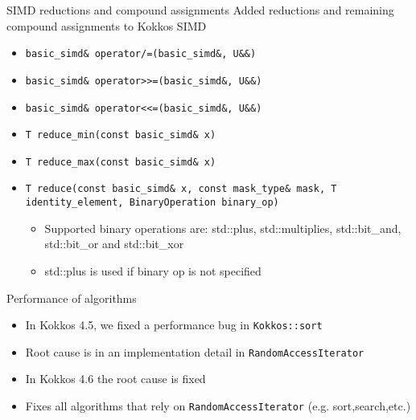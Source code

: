 \begin{frame}[fragile]{SIMD reductions and compound assignments}
  Added reductions and remaining compound assignments to Kokkos SIMD

  \begin{itemize}
    \item \texttt{basic\_simd\& operator/=(basic\_simd\&, U\&\&)}
    \item \texttt{basic\_simd\& operator>>=(basic\_simd\&, U\&\&)}
    \item \texttt{basic\_simd\& operator<<=(basic\_simd\&, U\&\&)}
  \end{itemize}

  \vspace{5pt}
  
  \begin{itemize}
    \item \texttt{T reduce\_min(const basic\_simd\& x)}
    \item \texttt{T reduce\_max(const basic\_simd\& x)}
    \item \texttt{T reduce(const basic\_simd\& x, const mask\_type\& mask, T identity\_element, BinaryOperation binary\_op)}
      \begin{itemize}
        \item Supported binary operations are: std::plus, std::multiplies, std::bit\_and, std::bit\_or and std::bit\_xor
        \item std::plus is used if binary op is not specified
      \end{itemize}
  \end{itemize}

\end{frame}
\begin{frame}[fragile]{Performance of algorithms}

  \begin{itemize}
    \item In Kokkos 4.5, we fixed a performance bug in \texttt{Kokkos::sort}
    \item Root cause is in an implementation detail in \texttt{RandomAccessIterator}
  \end{itemize}

  \vspace{10pt}

  \begin{itemize}
    \item In Kokkos 4.6 the root cause is fixed
    \item Fixes all algorithms that rely on \texttt{RandomAccessIterator} (e.g. sort,search,etc.)
  \end{itemize}

\end{frame}
